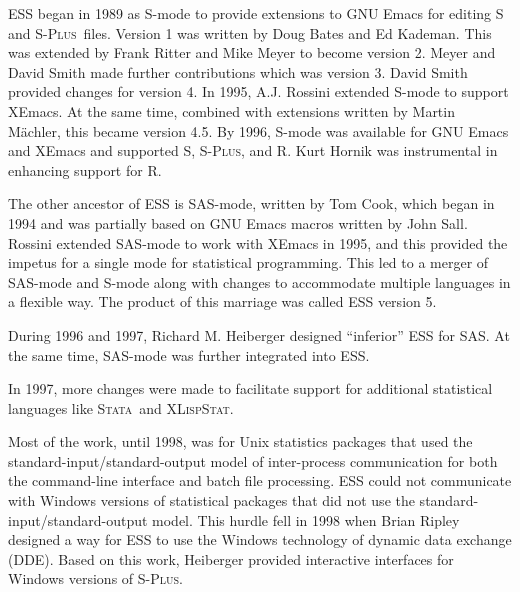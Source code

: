 \documentclass{article}
\newcommand*{\SAS}{\textsc{SAS}}
\newcommand*{\Splus}{\textsc{S-Plus}}
\newcommand*{\XLispStat}{\textsc{XLispStat}}
\newcommand*{\Stata}{\textsc{Stata}}
\newcommand{\stexttt}[1]{{\small\texttt{#1}}}
\begin{document}
ESS began in 1989 as S-mode to provide extensions to GNU Emacs for
editing S and \Splus\ files.  Version 1 was written by Doug Bates and
Ed Kademan.  This was extended by Frank Ritter and Mike Meyer to
become version 2.  Meyer and David Smith made further contributions
which was version 3. David Smith provided changes for version 4.  
In 1995, A.J. Rossini extended S-mode to support XEmacs.  At the same
time, combined with extensions written by Martin M{\"a}chler, this
became version 4.5.  By 1996, S-mode was available for GNU Emacs and
XEmacs and supported S, \Splus, and R.  Kurt Hornik was instrumental
in enhancing support for R.

The other ancestor of ESS is SAS-mode, written by Tom Cook, which
began in 1994 and was partially based on GNU Emacs macros written by
John Sall.
Rossini extended SAS-mode to work with XEmacs in 1995, and this provided the
impetus for a single mode for statistical programming.
This led to a merger of SAS-mode and S-mode along with changes
to accommodate multiple languages in a flexible way.  The product of this
marriage was called ESS version 5.

During 1996 and 1997, Richard M. Heiberger designed ``inferior'' ESS for \SAS.
At the same time, SAS-mode was further integrated into ESS.

In 1997, more changes were made to facilitate
support for additional statistical languages like \Stata\ and \XLispStat.

Most of the work, until 1998, was for Unix statistics
packages that used the standard-input/standard-output model of inter-process
communication for both the command-line interface and batch file
processing.  ESS could not communicate
with Windows versions of statistical packages that did not
use the standard-input/standard-output model.  This hurdle
fell in 1998 when Brian Ripley designed a way for ESS to use
the Windows technology of dynamic data exchange (DDE).
Based on this work, Heiberger provided interactive interfaces
for Windows versions of \Splus.
\end{document}
